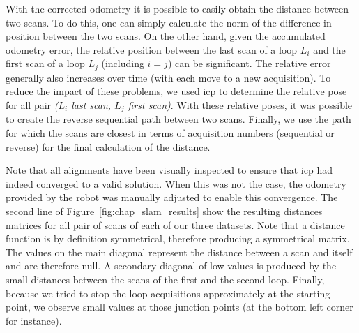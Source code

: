 With the corrected odometry it is possible to easily obtain the distance between two scans. To do this, one can simply calculate the norm of the difference in position between the two scans. On the other hand, given the accumulated odometry error, the relative position between the last scan of a loop $L_i$ and the first scan of a loop $L_j$ (including $i=j$) can be significant. The relative error generally also increases over time (with each move to a new acquisition). To reduce the impact of these problems, we used \gls*{icp} to determine the relative pose for all pair \textit{($L_i$ last scan, $L_j$ first scan)}. With these relative poses, it was possible to create the reverse sequential path between two scans. Finally, we use the path for which the scans are closest in terms of acquisition numbers (sequential or reverse) for the final calculation of the distance.

Note that all alignments have been visually inspected to ensure that \gls*{icp} had indeed converged to a valid solution. When this was not the case, the odometry provided by the robot was manually adjusted to enable this convergence. The second line of Figure~\ref{fig:chap_slam_results} show the resulting distances matrices for all pair of scans of each of our three datasets. Note that a distance function is by definition symmetrical, therefore producing a symmetrical matrix. The values on the main diagonal represent the distance between a scan and itself and are therefore null. A secondary diagonal of low values is produced by the small distances between the scans of the first and the second loop. Finally, because we tried to stop the loop acquisitions approximately at the starting point, we observe small values at those junction points (at the bottom left corner for instance).

